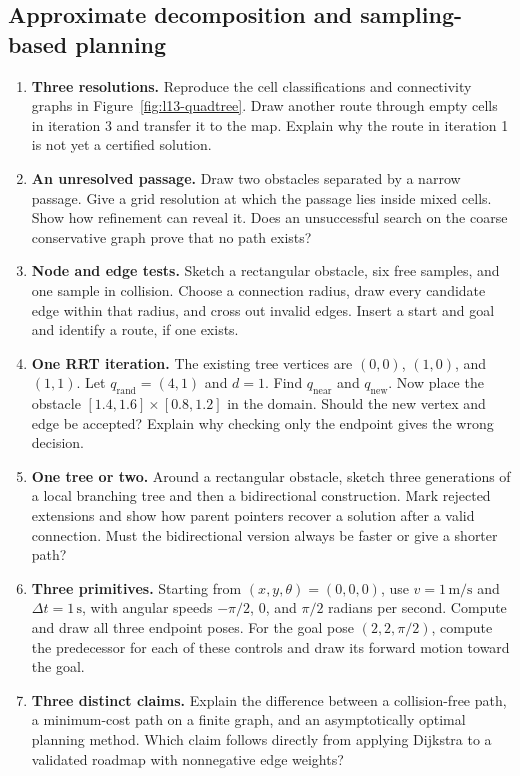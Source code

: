 \subsection{Approximate decomposition and sampling-based planning}
\begin{enumerate}
\item \textbf{Three resolutions.} Reproduce the cell classifications and
connectivity graphs in Figure~\ref{fig:l13-quadtree}. Draw another route
through empty cells in iteration 3 and transfer it to the map. Explain why
the route in iteration 1 is not yet a certified solution.
\item \textbf{An unresolved passage.} Draw two obstacles separated by a
narrow passage. Give a grid resolution at which the passage lies inside
mixed cells. Show how refinement can reveal it. Does an unsuccessful
search on the coarse conservative graph prove that no path exists?
\item \textbf{Node and edge tests.} Sketch a rectangular obstacle, six
free samples, and one sample in collision. Choose a connection radius,
draw every candidate edge within that radius, and cross out invalid edges.
Insert a start and goal and identify a route, if one exists.
\item \textbf{One RRT iteration.} The existing tree vertices are
$(0,0)$, $(1,0)$, and $(1,1)$. Let $q_{\mathrm{rand}}=(4,1)$ and
$d=1$. Find $q_{\mathrm{near}}$ and $q_{\mathrm{new}}$. Now place the
obstacle $[1.4,1.6]\times[0.8,1.2]$ in the domain. Should the new vertex
and edge be accepted? Explain why checking only the endpoint gives the
wrong decision.
\item \textbf{One tree or two.} Around a rectangular obstacle, sketch
three generations of a local branching tree and then a bidirectional
construction. Mark rejected extensions and show how parent pointers recover
a solution after a valid connection. Must the bidirectional version always
be faster or give a shorter path?
\item \textbf{Three primitives.} Starting from $(x,y,\theta)=(0,0,0)$,
use $v=1\,\mathrm{m/s}$ and $\Delta t=1\,\mathrm{s}$, with angular
speeds $-\pi/2$, $0$, and $\pi/2$ radians per second.
Compute and draw all three endpoint poses. For the goal pose $(2,2,\pi/2)$,
compute the predecessor for each of these controls and draw its forward
motion toward the goal.
\item \textbf{Three distinct claims.} Explain the difference between
a collision-free path, a minimum-cost path on a finite graph, and an
asymptotically optimal planning method. Which claim follows directly from
applying Dijkstra to a validated roadmap with nonnegative edge weights?
\end{enumerate}
